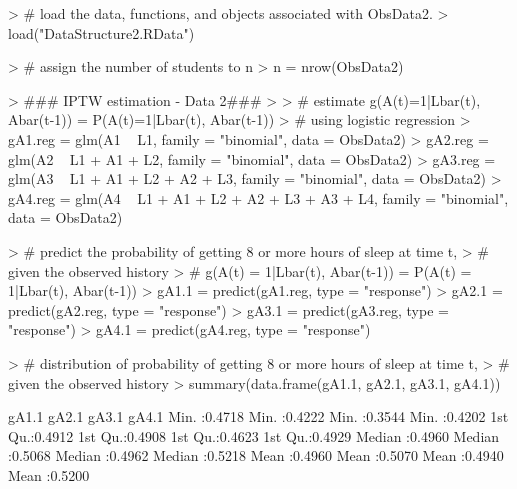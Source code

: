 \documentclass{exam}
\begin{document}
\begin{enumerate}
\begin{solution}

\begin{Schunk}
\begin{Sinput}
> # load the data, functions, and objects associated with ObsData2.
> load("DataStructure2.RData")
\end{Sinput}
\end{Schunk}
\begin{Schunk}
\begin{Sinput}
> # assign the number of students to n
> n = nrow(ObsData2)
\end{Sinput}
\end{Schunk}
\begin{Schunk}
\begin{Sinput}
> ### IPTW estimation - Data 2###
> 
> # estimate g(A(t)=1|Lbar(t), Abar(t-1)) = P(A(t)=1|Lbar(t), Abar(t-1)) 
> # using logistic regression
> gA1.reg = glm(A1 ~ L1, family = "binomial", data = ObsData2)
> gA2.reg = glm(A2 ~ L1 + A1 + L2, family = "binomial", data = ObsData2)
> gA3.reg = glm(A3 ~ L1 + A1 + L2 + A2 + L3, family = "binomial", data = ObsData2)
> gA4.reg = glm(A4 ~ L1 + A1 + L2 + A2 + L3 + A3 + L4, family = "binomial", data = ObsData2)
\end{Sinput}
\end{Schunk}
\begin{Schunk}
\begin{Sinput}
> # predict the probability of getting 8 or more hours of sleep at time t, 
> # given the observed history
> # g(A(t) = 1|Lbar(t), Abar(t-1)) = P(A(t) = 1|Lbar(t), Abar(t-1))
> gA1.1 = predict(gA1.reg, type = "response")
> gA2.1 = predict(gA2.reg, type = "response")
> gA3.1 = predict(gA3.reg, type = "response")
> gA4.1 = predict(gA4.reg, type = "response")
\end{Sinput}
\end{Schunk}
\begin{Schunk}
\begin{Sinput}
> # distribution of probability of getting 8 or more hours of sleep at time t, 
> # given the observed history
> summary(data.frame(gA1.1, gA2.1, gA3.1, gA4.1))
\end{Sinput}
\begin{Soutput}
     gA1.1            gA2.1            gA3.1            gA4.1       
 Min.   :0.4718   Min.   :0.4222   Min.   :0.3544   Min.   :0.4202  
 1st Qu.:0.4912   1st Qu.:0.4908   1st Qu.:0.4623   1st Qu.:0.4929  
 Median :0.4960   Median :0.5068   Median :0.4962   Median :0.5218  
 Mean   :0.4960   Mean   :0.5070   Mean   :0.4940   Mean   :0.5200  

\end{Soutput}
\end{Schunk}
\end{solution}
\end{enumerate}
\end{document}
